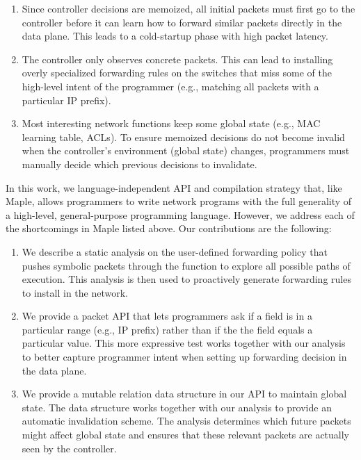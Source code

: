 \documentclass[preprint]{sigplanconf}
\begin{document}
\begin{enumerate}
\item Since controller decisions are memoized, all initial packets must first go to the controller before it can learn how to forward similar packets directly in the data plane. This leads to a cold-startup phase with high packet latency.
\item The controller only observes concrete packets. This can lead to installing overly specialized forwarding rules on the switches that miss some of the high-level intent of the programmer (e.g., matching all packets with a particular IP prefix).
\item Most interesting network functions keep some global state (e.g., MAC learning table, ACLs). To ensure memoized decisions do not become invalid when the controller's environment (global state) changes, programmers must manually decide which previous decisions to invalidate.
\end{enumerate}


In this work, we language-independent API and compilation strategy that, like Maple, allows programmers to write network programs with the full generality of a high-level, general-purpose programming language.
However, we address each of the shortcomings in Maple listed above. Our contributions are the following:

\begin{enumerate}
\item We describe a static analysis on the user-defined forwarding policy that pushes symbolic packets through the function to explore all possible paths of execution. This analysis is then used to proactively generate forwarding rules to install in the network.
\item We provide a packet API that lets programmers ask if a field is in a particular range (e.g., IP prefix) rather than if the the field equals a particular value. This more expressive test works together with our analysis to better capture programmer intent when setting up forwarding decision in the data plane.
\item We provide a mutable relation data structure in our API to maintain global state. The data structure works together with our analysis to provide an automatic invalidation scheme. The analysis determines which future packets might affect global state and ensures that these relevant packets are actually seen by the controller.
\end{enumerate}
\end{document}
